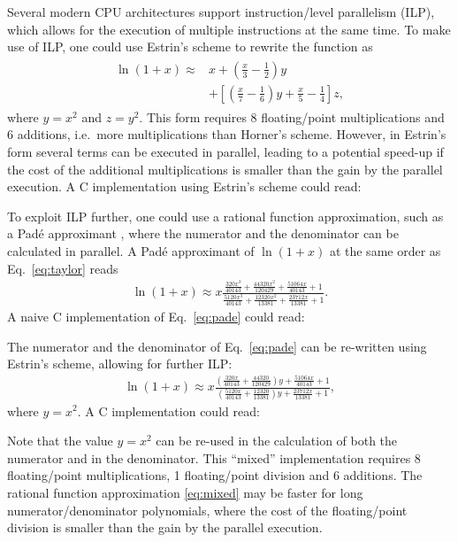 \documentclass[10pt,DIV16,twocolumn]{scrartcl}
\begin{document}
Several modern CPU architectures support instruction\-/level
parallelism (ILP), which allows for the execution of multiple
instructions at the same time.  To make use of ILP, one could use
Estrin's scheme \cite{estrin} to rewrite the function as
%
\begin{align}
\begin{split}
  \ln(1+x) \approx{}& x + \left(\frac{x}{3}-\frac{1}{2}\right)
    y \\ &+\left[\left(\frac{x}{7}-\frac{1}{6}\right)
    y+\frac{x}{5}-\frac{1}{4}\right] z,
\end{split}\label{eq:estrin}%
\end{align}
%
where $y=x^2$ and $z=y^2$.  This form requires 8 floating\-/point
multiplications and 6 additions, i.e.\ more multiplications than
Horner's scheme.  However, in Estrin's form several terms can be
executed in parallel, leading to a potential speed-up if the cost of
the additional multiplications is smaller than the gain by the
parallel execution.  A C implementation using Estrin's scheme could
read:
%


To exploit ILP further, one could use a rational function
approximation, such as a Padé approximant \cite{pade}, where the
numerator and the denominator can be calculated in parallel.  A Padé
approximant of $\ln(1+x)$ at the same order as Eq.~\eqref{eq:taylor}
reads
%
\begin{align}
  \ln(1+x) \approx x
  \frac{\frac{320 x^3}{40143}+\frac{44320 x^2}{120429}+\frac{51064
    x}{40143}+1}{\frac{5120 x^3}{40143}+\frac{12320 x^2}{13381}+\frac{23712
    x}{13381}+1}.
  \label{eq:pade}
\end{align}
%
A naive C implementation of Eq.~\eqref{eq:pade} could read:
%

%
The numerator and the denominator of Eq.~\eqref{eq:pade} can be
re-written using Estrin's scheme, allowing for further ILP:
%
\begin{align}
  \ln(1+x) \approx x
  \frac{\left(\frac{320 x}{40143}+\frac{44320}{120429}\right)y+\frac{51064
    x}{40143}+1}{\left(\frac{5120 x}{40143}+\frac{12320}{13381}\right)y+\frac{23712
    x}{13381}+1},
  \label{eq:mixed}
\end{align}
%
where $y=x^2$.  A C implementation could read:
%

%
Note that the value $y=x^2$ can be re-used in the calculation of both
the numerator and in the denominator.  This ``mixed'' implementation
requires 8 floating\-/point multiplications, 1 floating\-/point
division and 6 additions.  The rational function approximation
\eqref{eq:mixed} may be faster for long numerator/denominator
polynomials, where the cost of the floating\-/point division is
smaller than the gain by the parallel execution.
\end{document}
